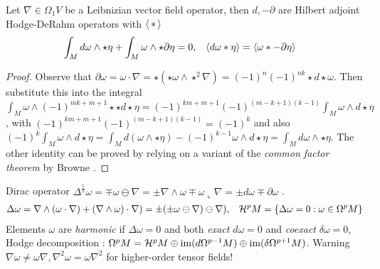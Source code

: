 \documentclass[]{article}
\begin{document}
\begin{theorem}
	Let $ \nabla \in\Omega_1 V $ be a Leibnizian vector field operator, then $d,-\partial$ are Hilbert adjoint Hodge-DeRahm operators with $\left\langle \,\ast\, \right\rangle$
	\begin{align*}
		\int_M d\omega\wedge\star\eta +\int_M \omega\wedge\star\partial\eta &= 0, & \left\langle d\omega\ast\eta \right\rangle &=\left\langle \omega\ast-\partial\eta \right\rangle
	\end{align*}
\end{theorem}
\begin{proof}
	Observe that $\partial\omega = \omega\cdot\nabla = \star(\star\omega\wedge\star^2\nabla) = (-1)^n(-1)^{nk}\star d\star\omega$.
	Then  substitute this into the integral $\int_M \omega\wedge(-1)^{mk+m+1}\star\star d\star\eta = (-1)^{km+m+1}(-1)^{(m-k+1)(k-1)}\int_M\omega\wedge d\star\eta$,
	with $(-1)^{km+m+1}(-1)^{(m-k+1)(k-1)}=(-1)^k$ and also
	$ (-1)^k\int_M\omega\wedge d\star\eta = \int_M d(\omega\wedge\star\eta) - (-1)^{k-1}\omega\wedge d\star\eta = \int_M d\omega\wedge\star\eta$.
	The other identity can be proved by relying on a variant of the \textit{common factor theorem} by Browne \cite{browne}.
\end{proof}
\begin{theorem}
	Dirac operator $ \Delta^\frac12\omega = \mp\omega\ominus\nabla = \pm\nabla\wedge\omega \mp \omega\llcorner\nabla  = \pm d\omega\mp\partial\omega$ \cite{garling}.
	\begin{align*}
		\Delta\omega &= \nabla\wedge(\omega\cdot\nabla) + (\nabla\wedge\omega)\cdot\nabla) = \pm(\pm\omega\ominus\nabla)\ominus\nabla), & \mathcal{H}^p M = \left\{ \Delta\omega = 0 : \omega\in \Omega^pM \right\}
	\end{align*}
	Elements $\omega$ are \textit{harmonic} if $\Delta\omega = 0$ and both \textit{exact} $d\omega=0$ and \textit{coexact} $\delta\omega=0$, Hodge decomposition \cite{ivancevic}:
	$\Omega^pM=\mathcal{H}^pM\oplus\text{im}(d\Omega^{p-1}M)\oplus\text{im}(\delta\Omega^{p+1}M)$.
	Warning $\nabla\omega\neq\omega\nabla, \nabla^2\omega=\omega\nabla^2$ for higher-order tensor fields!
\end{theorem}

\end{document}
